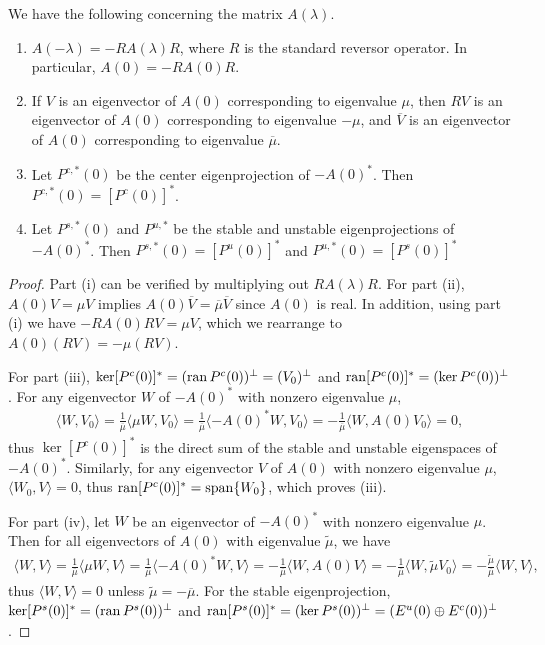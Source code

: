 \documentclass[thesis.tex]{subfiles}
\begin{document}
\begin{lemma}\label{lemma:Afacts}
We have the following concerning the matrix $A(\lambda)$.
\begin{enumerate}
	\item $A(-\lambda) = -R A(\lambda)R$, where $R$ is the standard reversor operator. In particular, $A(0) = -R A(0)R$.
	\item If $V$ is an eigenvector of $A(0)$ corresponding to eigenvalue $\mu$, then $RV$ is an eigenvector of $A(0)$ corresponding to eigenvalue $-\mu$, and $\overline{V}$ is an eigenvector of $A(0)$ corresponding to eigenvalue $\overline{\mu}$. 
	\item Let $P^{c,*}(0)$ be the center eigenprojection of $-A(0)^*$. Then $P^{c,*}(0) = [P^c(0)]^*$. 
	\item Let $P^{s,*}(0)$ and $P^{u,*}$ be the stable and unstable eigenprojections of $-A(0)^*$. Then $P^{s,*}(0) = [P^u(0)]^*$ and $P^{u,*}(0) = [P^s(0)]^*$
\end{enumerate}	
\begin{proof}
Part (i) can be verified by multiplying out $R A(\lambda)R$. For part (ii), $A(0)V = \mu V$ implies $A(0)\overline{V} = \overline{\mu}\overline{V}$ since $A(0)$ is real. In addition, using part (i) we have $-R A(0) R V = \mu V$, which we rearrange to $A(0) (RV) = -\mu(RV)$. 

For part (iii), $\mathop\mathrm{ker}\nolimits [P^c(0)]^* = (\operatorname{ran} P^c(0))^\perp = (V_0)^\perp$  and $\operatorname{ran} [P^c(0)]^* = (\mathop\mathrm{ker}\nolimits P^c(0))^\perp$. For any eigenvector $W$ of $-A(0)^*$ with nonzero eigenvalue $\mu$,
\begin{align*}
\langle W, V_0 \rangle = \frac{1}{\overline{\mu}} \langle \mu W, V_0 \rangle
= \frac{1}{\overline{\mu}}\langle -A(0)^* W, V_0 \rangle = -\frac{1}{\overline{\mu}}\langle W, A(0) V_0 \rangle = 0,
\end{align*}
thus $\ker [P^c(0)]^*$ is the direct sum of the stable and unstable eigenspaces of $-A(0)^*$. Similarly, for any eigenvector $V$ of $A(0)$ with nonzero eigenvalue $\mu$, $\langle W_0, V \rangle = 0$, thus $\operatorname{ran} [P^c(0)]^* = \operatorname{span}\{W_0\}$, which proves (iii).

For part (iv), let $W$ be an eigenvector of $-A(0)^*$ with nonzero eigenvalue $\mu$. Then for all eigenvectors of $A(0)$ with eigenvalue $\tilde{\mu}$, we have 
\begin{align*}
\langle W, V \rangle = \frac{1}{\overline{\mu}} \langle \mu W, V \rangle
= \frac{1}{\overline{\mu}}\langle -A(0)^* W, V \rangle = -\frac{1}{\overline{\mu}}\langle W, A(0) V \rangle = -\frac{1}{\overline{\mu}}\langle W, \tilde{\mu} V_0 \rangle = -\frac{\tilde{\mu}}{\overline{\mu}}\langle W, V \rangle,
\end{align*}
thus $\langle W, V \rangle = 0$ unless $\tilde{\mu} = -\overline{\mu}$. For the stable eigenprojection, $\mathop\mathrm{ker}\nolimits [P^s(0)]^* = (\operatorname{ran} P^s(0))^\perp$ and $\operatorname{ran} [P^s(0)]^* = (\mathop\mathrm{ker}\nolimits P^s(0))^\perp = (E^u(0) \oplus E^c(0))^\perp$. 


\end{proof}
\end{lemma}
\end{document}
